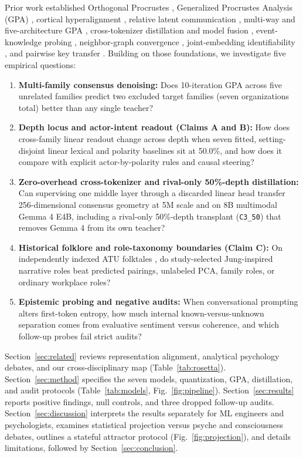 \documentclass[conference]{IEEEtran}
\begin{document}
Prior work established Orthogonal Procrustes \cite{schonemann1966procrustes}, Generalized Procrustes Analysis (GPA) \cite{gower1975gpa}, cortical hyperalignment \cite{haxby2011hyperalignment}, relative latent communication \cite{moschella2023relative}, multi-way and five-architecture GPA \cite{achara2026multiway,anthonio2026five}, cross-tokenizer distillation and model fusion \cite{boizard2025uld,wan2024fusellm}, event-knowledge probing \cite{kauf2023event}, neighbor-graph convergence \cite{huh2024platonic}, joint-embedding identifiability \cite{balestriero2026proving}, and pairwise key transfer \cite{cheng2026platoskey}. Building on those foundations, we investigate five empirical questions:
\begin{enumerate}
  \item \textbf{Multi-family consensus denoising:} Does 10-iteration GPA across five unrelated families predict two excluded target families (seven organizations total) better than any single teacher?
  \item \textbf{Depth locus and actor-intent readout (Claims A and B):} How does cross-family linear readout change across depth when seven fitted, setting-disjoint linear lexical and polarity baselines sit at 50.0\%, and how does it compare with explicit actor-by-polarity rules and causal steering?
  \item \textbf{Zero-overhead cross-tokenizer and rival-only 50\%-depth distillation:} Can supervising one middle layer through a discarded linear head transfer 256-dimensional consensus geometry at 5M scale and on 8B multimodal Gemma 4 E4B, including a rival-only 50\%-depth transplant (\texttt{C3\_50}) that removes Gemma 4 from its own teacher?
  \item \textbf{Historical folklore and role-taxonomy boundaries (Claim C):} On independently indexed ATU folktales \cite{uther2004types,hagedorn2022bearing}, do study-selected Jung-inspired narrative roles beat predicted pairings, unlabeled PCA, family roles, or ordinary workplace roles?
  \item \textbf{Epistemic probing and negative audits:} When conversational prompting alters first-token entropy, how much internal known-versus-unknown separation comes from evaluative sentiment versus coherence, and which follow-up probes fail strict audits?
\end{enumerate}

Section~\ref{sec:related} reviews representation alignment, analytical psychology debates, and our cross-disciplinary map (Table~\ref{tab:rosetta}). Section~\ref{sec:method} specifies the seven models, quantization, GPA, distillation, and audit protocols (Table~\ref{tab:models}, Fig.~\ref{fig:pipeline}). Section~\ref{sec:results} reports positive findings, null controls, and three dropped follow-up audits. Section~\ref{sec:discussion} interprets the results separately for ML engineers and psychologists, examines statistical projection versus psyche and consciousness debates, outlines a stateful attractor protocol (Fig.~\ref{fig:projection}), and details limitations, followed by Section~\ref{sec:conclusion}.
\end{document}
